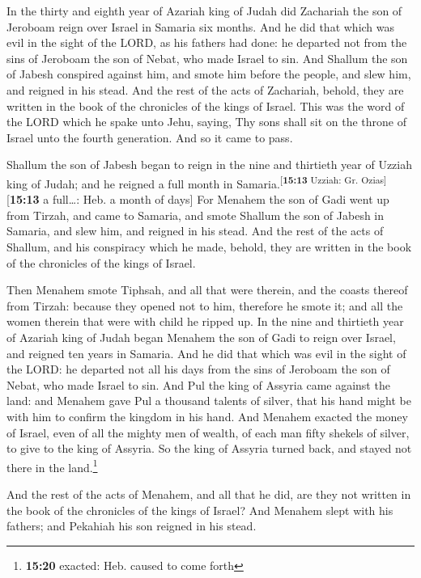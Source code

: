  In the thirty and eighth year of Azariah king of Judah
did Zachariah the son of Jeroboam reign over Israel in Samaria six
months.  And he did that which was evil in the sight of
the LORD, as his fathers had done: he departed not from the sins of
Jeroboam the son of Nebat, who made Israel to sin.  And
Shallum the son of Jabesh conspired against him, and smote him before
the people, and slew him, and reigned in his stead.  And
the rest of the acts of Zachariah, behold, they are written in the book
of the chronicles of the kings of Israel.  This was the
word of the LORD which he spake unto Jehu, saying, Thy sons shall sit on
the throne of Israel unto the fourth generation. And so it came to pass.

 Shallum the son of Jabesh began to reign in the nine and
thirtieth year of Uzziah king of Judah; and he reigned a full month in
Samaria.\textsuperscript{{[}\textbf{15:13} Uzziah: Gr.
Ozias{]}}{[}\textbf{15:13} a full\ldots: Heb. a month of days{]}
 For Menahem the son of Gadi went up from Tirzah, and
came to Samaria, and smote Shallum the son of Jabesh in Samaria, and
slew him, and reigned in his stead.  And the rest of the
acts of Shallum, and his conspiracy which he made, behold, they are
written in the book of the chronicles of the kings of Israel.

 Then Menahem smote Tiphsah, and all that were therein,
and the coasts thereof from Tirzah: because they opened not to him,
therefore he smote it; and all the women therein that were with child he
ripped up.  In the nine and thirtieth year of Azariah
king of Judah began Menahem the son of Gadi to reign over Israel, and
reigned ten years in Samaria.  And he did that which was
evil in the sight of the LORD: he departed not all his days from the
sins of Jeroboam the son of Nebat, who made Israel to sin.
 And Pul the king of Assyria came against the land: and
Menahem gave Pul a thousand talents of silver, that his hand might be
with him to confirm the kingdom in his hand.  And Menahem
exacted the money of Israel, even of all the mighty men of wealth, of
each man fifty shekels of silver, to give to the king of Assyria. So the
king of Assyria turned back, and stayed not there in the
land.\footnote{\textbf{15:20} exacted: Heb. caused to come forth}

 And the rest of the acts of Menahem, and all that he
did, are they not written in the book of the chronicles of the kings of
Israel?  And Menahem slept with his fathers; and Pekahiah
his son reigned in his stead.

